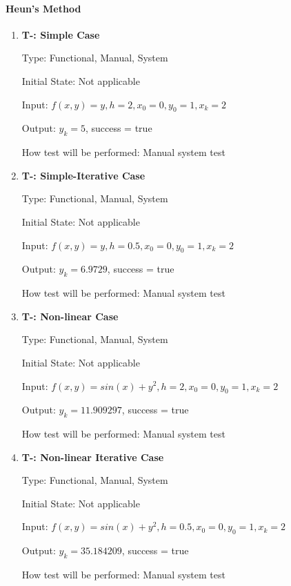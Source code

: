 \documentclass[12pt, titlepage]{article}
\newcounter{tnum} %
\begin{document}
\paragraph{Heun's Method}
\begin{enumerate}

\item{\textbf{T-\thetnum \label{t-heun_simple}: Simple Case}}

Type: Functional, Manual, System %
					
Initial State: Not applicable
					
Input: $f(x, y) = y, h = 2, x_0 = 0, y_0 = 1, x_k = 2$
					
Output: $y_k = 5$, success = true
					
How test will be performed: Manual system test

\item{\textbf{T-\thetnum \label{t-heun_simpleiterative}: Simple-Iterative Case}}

Type: Functional, Manual, System %
					
Initial State: Not applicable
					
Input: $f(x, y) = y, h = 0.5, x_0 = 0, y_0 = 1, x_k = 2$
					
Output: $y_k = 6.9729$, success = true
					
How test will be performed: Manual system test

\item{\textbf{T-\thetnum \label{t-heunnonlinear}: Non-linear Case}}

Type: Functional, Manual, System %
					
Initial State: Not applicable
					
Input: $f(x, y) = sin(x) + y^2, h = 2, x_0 = 0, y_0 = 1, x_k = 2$
					
Output: $y_k = 11.909297$, success = true
					
How test will be performed: Manual system test

\item{\textbf{T-\thetnum \label{t-heun_nonlineariterative}: Non-linear Iterative Case}}

Type: Functional, Manual, System %
					
Initial State: Not applicable
					
Input: $f(x, y) = sin(x) + y^2, h = 0.5, x_0 = 0, y_0 = 1, x_k = 2$
					
Output: $y_k = 35.184209$, success = true
					
How test will be performed: Manual system test

\end{enumerate}
\end{document}
